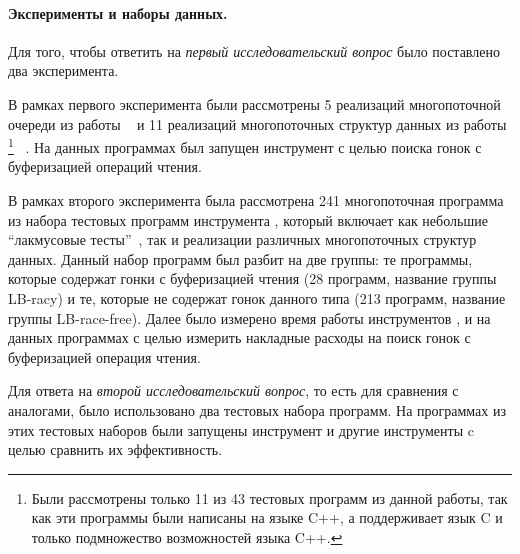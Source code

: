 \paragraph{Эксперименты и наборы данных.} 

Для того, чтобы ответить на \emph{первый исследовательский вопрос} 
было поставлено два эксперимента. 

В рамках первого эксперимента были рассмотрены 
5 реализаций многопоточной очереди из работы%
~\cite{Kokologiannakis:PLDI2019}
и 11 реализаций многопоточных структур данных из работы%
\footnote{Были рассмотрены только 11 из 43 
тестовых программ из данной работы, 
так как эти программы были написаны на языке C++,
а \genmc поддерживает язык C и только подмножество возможностей языка C++.}
~\cite{Ou-Demsky:OOPSLA18}.
На данных программах был запущен инструмент \wmc с целью 
поиска гонок с буферизацией операций чтения.


В рамках второго эксперимента была рассмотрена 241 многопоточная программа 
из набора тестовых программ инструмента \genmc, 
который включает как небольшие ``лакмусовые тесты''~\cite{Alglave-al:TACAS2011}, 
так и реализации различных многопоточных структур данных.
Данный набор программ был разбит на две группы:
те программы, которые содержат гонки с буферизацией чтения 
(28 программ, название группы LB-racy)
и те, которые не содержат гонок данного типа 
(213 программ, название группы LB-race-free).
Далее было измерено время работы инструментов \genmc, \hmc и \wmc на данных программах
с целью измерить накладные расходы на поиск гонок с буферизацией операция чтения.
  

Для ответа на \emph{второй исследовательский вопрос}, 
то есть для сравнения \wmc с аналогами, 
было использовано два тестовых набора программ.
На программах из этих тестовых наборов были запущены 
инструмент \wmc и другие инструменты c целью сравнить их эффективность.

